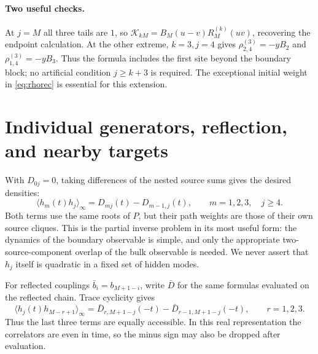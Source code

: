 \documentclass[11pt,a4paper]{article}
\newcommand{\av}[1]{\langle #1\rangle_\infty}
\newcommand{\Kern}{\mathcal K}
\begin{document}
\paragraph{Two useful checks.}
At $j=M$ all three tails are $1$, so
$\Kern_{kM}=B_M(u-v)R_M^{(k)}(uv)$, recovering the endpoint calculation. At the other extreme, $k=3,j=4$ gives
$\rho_{2,4}^{(3)}=-yB_2$ and $\rho_{1,4}^{(3)}=-yB_3$.
Thus the formula includes the first site beyond the boundary block; no artificial condition $j\ge k+3$ is required. The exceptional initial weight in \eqref{eq:rhorec} is essential for this extension.

\section{Individual generators, reflection, and nearby targets}
With $D_{0j}=0$, taking differences of the nested source sums gives the desired densities:
\begin{equation}
 \boxed{\av{h_m(t)h_j}=D_{mj}(t)-D_{m-1,j}(t),
 \qquad m=1,2,3,\quad j\ge4.}
 \label{eq:individual}
\end{equation}
Both terms use the same roots of $P$, but their path weights are those of their own source cliques. This is the partial inverse problem in its most useful form: the dynamics of the boundary observable is simple, and only the appropriate two-source-component overlap of the bulk observable is needed. We never assert that $h_j$ itself is quadratic in a fixed set of hidden modes.

For reflected couplings $\bar b_i=b_{M+1-i}$, write $\bar D$ for the same formulas evaluated on the reflected chain. Trace cyclicity gives
\begin{equation}
 \av{h_j(t)h_{M-r+1}}
 =\bar D_{r,M+1-j}(-t)-\bar D_{r-1,M+1-j}(-t),\qquad r=1,2,3.
 \label{eq:reflection}
\end{equation}
Thus the last three terms are equally accessible. In this real representation the correlators are even in time, so the minus sign may also be dropped after evaluation.
\end{document}
